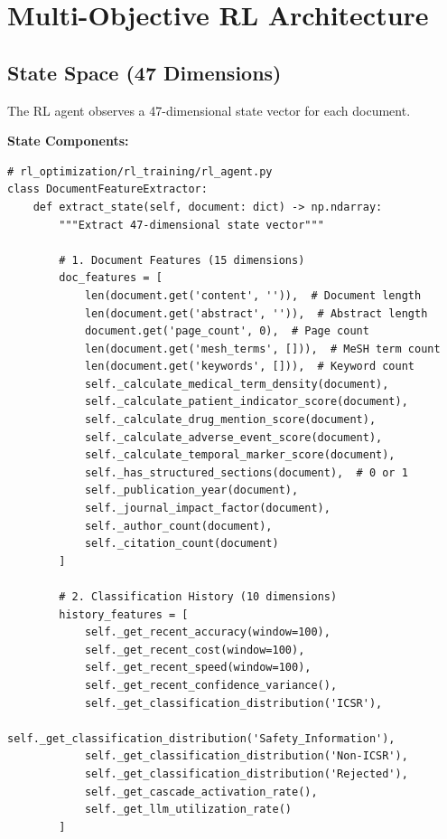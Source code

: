 \section{Multi-Objective RL Architecture}

\subsection{State Space (47 Dimensions)}

The RL agent observes a 47-dimensional state vector for each document.

\textbf{State Components:}
\begin{lstlisting}[style=pythonstyle]
# rl_optimization/rl_training/rl_agent.py
class DocumentFeatureExtractor:
    def extract_state(self, document: dict) -> np.ndarray:
        """Extract 47-dimensional state vector"""
        
        # 1. Document Features (15 dimensions)
        doc_features = [
            len(document.get('content', '')),  # Document length
            len(document.get('abstract', '')),  # Abstract length
            document.get('page_count', 0),  # Page count
            len(document.get('mesh_terms', [])),  # MeSH term count
            len(document.get('keywords', [])),  # Keyword count
            self._calculate_medical_term_density(document),
            self._calculate_patient_indicator_score(document),
            self._calculate_drug_mention_score(document),
            self._calculate_adverse_event_score(document),
            self._calculate_temporal_marker_score(document),
            self._has_structured_sections(document),  # 0 or 1
            self._publication_year(document),
            self._journal_impact_factor(document),
            self._author_count(document),
            self._citation_count(document)
        ]
        
        # 2. Classification History (10 dimensions)
        history_features = [
            self._get_recent_accuracy(window=100),
            self._get_recent_cost(window=100),
            self._get_recent_speed(window=100),
            self._get_recent_confidence_variance(),
            self._get_classification_distribution('ICSR'),
            self._get_classification_distribution('Safety_Information'),
            self._get_classification_distribution('Non-ICSR'),
            self._get_classification_distribution('Rejected'),
            self._get_cascade_activation_rate(),
            self._get_llm_utilization_rate()
        ]
        

\end{lstlisting}
